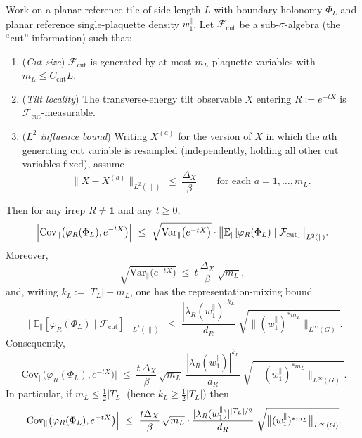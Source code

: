 \begin{lemma}\label{lem:routeC_covariance_pinning}
Work on a planar reference tile of side length $L$ with boundary holonomy $\Phi_L$ and planar reference single-plaquette density $w_1^{\parallel}$.
Let $\mathcal F_{\mathrm{cut}}$ be a sub-$\sigma$-algebra (the ``cut'' information) such that:
\begin{enumerate}
\item (\emph{Cut size}) $\mathcal F_{\mathrm{cut}}$ is generated by at most $m_L$ plaquette variables with $m_L\le C_{\mathrm{cut}}L$.
\item (\emph{Tilt locality}) The transverse-energy tilt observable $X$ entering $\overline R:=e^{-tX}$ is $\mathcal F_{\mathrm{cut}}$-measurable.
\item (\emph{$L^2$ influence bound}) Writing $X^{(a)}$ for the version of $X$ in which the $a$th generating cut variable is resampled
(independently, holding all other cut variables fixed), assume
\begin{equation}\label{eq:routeC_influence_assumption}
\bigl\|X-X^{(a)}\bigr\|_{L^2(\parallel)}\ \le\ \frac{\Delta_X}{\beta}
\qquad\text{for each }a=1,\dots,m_L .
\end{equation}
\end{enumerate}
Then for any irrep $R\neq\mathbf 1$ and any $t\ge 0$,
\begin{equation}\label{eq:routeC_cov_bound_general}
\Bigl|\mathrm{Cov}_{\parallel}\bigl(\varphi_R(\Phi_L), e^{-tX}\bigr)\Bigr|
\ \le\
\sqrt{\mathrm{Var}_{\parallel}\bigl(e^{-tX}\bigr)}\cdot \bigl\|\mathbb{E}_{\parallel}[\varphi_R(\Phi_L)\mid\mathcal F_{\mathrm{cut}}]\bigr\|_{L^2(\parallel)}.
\end{equation}
Moreover,
\begin{equation}\label{eq:routeC_tilt_L2_bound}
\sqrt{\mathrm{Var}_{\parallel}\bigl(e^{-tX}\bigr)}\ \le\ t\,\frac{\Delta_X}{\beta}\,\sqrt{m_L},
\end{equation}
and, writing $k_L:=|T_L|-m_L$, one has the representation-mixing bound
\begin{equation}\label{eq:routeC_condexp_decay}
\Big\|\mathbb{E}_{\parallel}[\varphi_R(\Phi_L)\mid\mathcal F_{\mathrm{cut}}]\Big\|_{L^2(\parallel)}
\;\le\;
\frac{|\lambda_R(w_1^{\parallel})|^{k_L}}{d_R}\;
\sqrt{\big\|(w_1^{\parallel})^{*m_L}\big\|_{L^\infty(G)}}.
\end{equation}
Consequently,
\begin{equation}\label{eq:routeC_covariance_bound}
\Big|\mathrm{Cov}_{\parallel}\big(\varphi_R(\Phi_L), e^{-tX}\big)\Big|
\;\le\;
\frac{t\,\Delta_X}{\beta}\,\sqrt{m_L}\;
\frac{|\lambda_R(w_1^{\parallel})|^{k_L}}{d_R}\;
\sqrt{\big\|(w_1^{\parallel})^{*m_L}\big\|_{L^\infty(G)}}.
\end{equation}
In particular, if $m_L\le \tfrac12|T_L|$ (hence $k_L\ge \tfrac12|T_L|$) then
\[
\Bigl|\mathrm{Cov}_{\parallel}\bigl(\varphi_R(\Phi_L), e^{-tX}\bigr)\Bigr|
\ \le\ 
\frac{t\Delta_X}{\beta}\,\sqrt{m_L}\cdot 
\frac{|\lambda_R(w_1^{\parallel})|^{|T_L|/2}}{d_R}\;
\sqrt{\big\|(w_1^{\parallel})^{*m_L}\big\|_{L^\infty(G)}}.
\]


\end{lemma}
